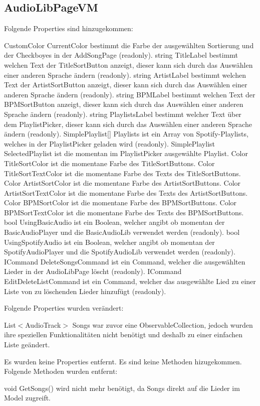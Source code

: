 \documentclass[../implementierung.tex]{subfiles}
\begin{document}
		\subsection{AudioLibPageVM}
			Folgende Properties sind hinzugekommen:
			\begin{itemize}
				\add CustomColor CurrentColor bestimmt die Farbe der ausgewählten Sortierung und der Checkboyes in der AddSongPage (readonly).
				\add string TitleLabel bestimmt welchen Text der TitleSortButton anzeigt, dieser kann sich durch das Auswählen einer anderen Sprache ändern (readonly).
				\add string ArtistLabel bestimmt welchen Text der ArtistSortButton anzeigt, dieser kann sich durch das Auswählen einer anderen Sprache ändern (readonly).
				\add string BPMLabel bestimmt welchen Text der BPMSortButton anzeigt, dieser kann sich durch das Auswählen einer anderen Sprache ändern (readonly).
				\add string PlaylistsLabel bestimmt welcher Text über dem PlaylistPicker, dieser kann sich durch das Auswählen einer anderen Sprache ändern (readonly).
				\add SimplePlaylist[] Playlists ist ein Array von Spotify-Playlists, welches in der PlaylistPicker geladen wird (readonly).
				\add SimplePlaylist SelectedPlaylist ist die momentan im PlaylistPicker ausgewählte Playlist.
				\add Color TitleSortColor ist die momentane Farbe des TitleSortButtons.
				\add Color TitleSortTextColor ist die momentane Farbe des Texts des TitleSortButtons.
				\add Color ArtistSortColor ist die momentane Farbe des ArtistSortButtons.
				\add Color ArtistSortTextColor ist die momentane Farbe des Texts des ArtistSortButtons.
				\add Color BPMSortColor ist die momentane Farbe des BPMSortButtons.
				\add Color BPMSortTextColor ist die momentane Farbe des Texts des BPMSortButtons.
				\add bool UsingBasicAudio ist ein Boolean, welcher angibt ob momentan der BasicAudioPlayer und die BasicAudioLib verwendet werden (readonly).
				\add bool UsingSpotifyAudio ist ein Boolean, welcher angibt ob momentan der SpotifyAudioPlayer und die SpotifyAudioLib verwendet werden (readonly).
				\add ICommand DeleteSongsCommand ist ein Command, welcher die ausgewählten Lieder in der AudioLibPage löscht (readonly).
				\add ICommand EditDeleteListCommand ist ein Command, welcher das ausgewählte Lied zu einer Liste von zu löschenden Lieder hinzufügt (readonly).
			\end{itemize}
			Folgende Properties wurden verändert:
			\begin{itemize}
				\changed List$<$AudioTrack$>$ Songs war zuvor eine ObservableCollection, jedoch wurden ihre speziellen Funktionalitäten nicht benötigt und deshalb zu einer einfachen Liste geändert.	
			\end{itemize}
			Es wurden keine Properties entfernt.
			Es sind keine Methoden hizugekommen.
			Folgende Methoden wurden entfernt:
			\begin{itemize}
				\remove void GetSongs() wird nicht mehr benötigt, da Songs direkt auf die Lieder im Model zugreift.	
			\end{itemize}
\end{document}
